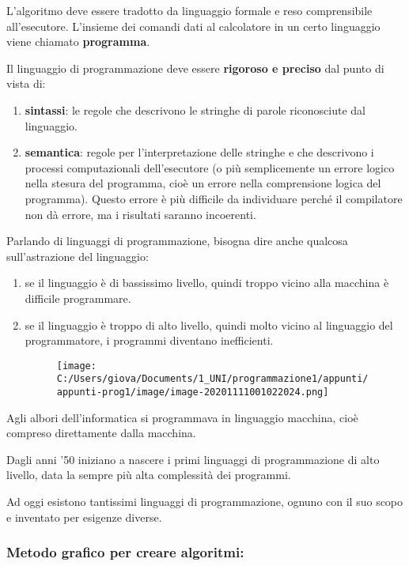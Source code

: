 \documentclass[
]{article}
\begin{document}
L'algoritmo deve essere tradotto da linguaggio formale e reso
comprensibile all'esecutore. L'insieme dei comandi dati al calcolatore
in un certo linguaggio viene chiamato \textbf{programma}.

Il linguaggio di programmazione deve essere \textbf{rigoroso e preciso}
dal punto di vista di:

\begin{enumerate}
\def\labelenumi{\arabic{enumi}.}
\item
  \textbf{sintassi}: le regole che descrivono le stringhe di parole
  riconosciute dal linguaggio.
\item
  \textbf{semantica}: regole per l'interpretazione delle stringhe e che
  descrivono i processi computazionali dell'esecutore (o più
  semplicemente un errore logico nella stesura del programma, cioè un
  errore nella comprensione logica del programma). Questo errore è più
  difficile da individuare perché il compilatore non dà errore, ma i
  risultati saranno incoerenti.
\end{enumerate}

Parlando di linguaggi di programmazione, bisogna dire anche qualcosa
sull'astrazione del linguaggio:

\begin{enumerate}
\def\labelenumi{\arabic{enumi}.}
\item
  se il linguaggio è di bassissimo livello, quindi troppo vicino alla
  macchina è difficile programmare.
\item
  se il linguaggio è troppo di alto livello, quindi molto vicino al
  linguaggio del programmatore, i programmi diventano inefficienti.

  \begin{figure}
  \centering
  \texttt{[image: C:/Users/giova/Documents/1\_UNI/programmazione1/appunti/appunti-prog1/image/image-20201111001022024.png]}
  \caption{}
  \end{figure}
\end{enumerate}

Agli albori dell'informatica si programmava in linguaggio macchina, cioè
compreso direttamente dalla macchina.

Dagli anni '50 iniziano a nascere i primi linguaggi di programmazione di
alto livello, data la sempre più alta complessità dei programmi.

Ad oggi esistono tantissimi linguaggi di programmazione, ognuno con il
suo scopo e inventato per esigenze diverse.

\hypertarget{header-n76}{%
\subsubsection{Metodo grafico per creare algoritmi:}\label{header-n76}}
\end{document}
